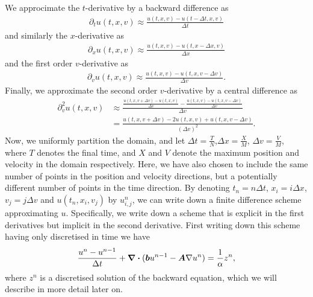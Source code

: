 We approcimate the $t$-derivative by a backward difference as
%
\begin{align} 
    \partial_t u(t,x,v) \approx \frac{u(t,x,v) - u(t-\Delta t,x,v)}{\Delta t}
\end{align}
%
and similarly the $x$-derivative as
%
\begin{align} 
    \partial_x u(t,x,v) \approx \frac{u(t,x,v) - u(t,x-\Delta x,v)}{\Delta x}
\end{align}
%
and the first order $v$-derivative as
%
\begin{align} 
    \partial_v u(t,x,v) \approx \frac{u(t,x,v) - u(t,x,v-\Delta v)}{\Delta v}.
\end{align}
%
Finally, we approximate the second order $v$-derivative by a central difference as
%
\begin{align} 
    \partial^2_v u(t,x,v) &\approx \frac{\frac{u(t,x,v+\Delta v)-u(t,x,v)}{\Delta v}-\frac{u(t,x,v)-u(t,x,v-\Delta v)}{\Delta v}}{\Delta v}\\
    &= \frac{u(t,x,v+\Delta v)- 2 u(t,x,v) + u(t,x,v-\Delta v)}{{(\Delta v)}^2}.
\end{align}
%
Now, we uniformly partition the domain, and let $\Delta t = \frac{T}{N}$,$\Delta x = \frac{X}{M}$, $\Delta v = \frac{V}{M}$, where $T$ denotes the final time, and $X$ and $V$ denote the maximum position and velocity in the domain respectively. Here, we have also chosen to include the same number of points in the position and velocity directions, but a potentially different number of points in the time direction. By denoting  $t_n=n\Delta t$, $x_i=i\Delta x$,$v_j=j\Delta v$ and $u(t_n,x_i,v_j)$ by $u^n_{i,j}$, we can write down a finite difference scheme approximating $u$. Specifically, we write down a scheme that is explicit in the first derivatives but implicit in the second derivative. First writing down this scheme having only discretised in time we have
%
\begin{align} %
    \frac{u^n-u^{n-1}}{\Delta t} + \div{(\vecbf{b}u^{n-1} - \vecbf{A} \nabla u^n)} = \frac{1}{\alpha} z^n,
\end{align}
%
where $z^n$ is a discretised solution of the backward equation, which we will describe in more detail later on.

